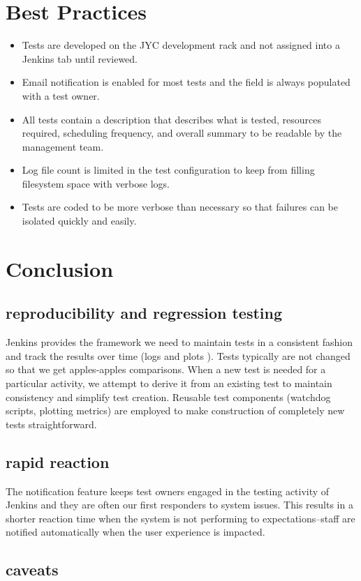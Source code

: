 \documentclass[10pt, conference, compsocconf]{IEEEtran}
\begin{document}
\section{Best Practices}
\begin{itemize}
\item Tests are developed on the JYC development rack and not assigned into a Jenkins tab until reviewed. 
\item Email notification is enabled for most tests and the field is always populated with a test owner.
\item All tests contain a description that describes what is tested, resources required, scheduling frequency, and overall summary  to be readable by the management team.
\item Log file count is limited in the test configuration to keep from filling filesystem space with verbose logs.
\item Tests are coded to be more verbose than necessary so that failures can be isolated quickly and easily.
\end{itemize}

\section{Conclusion}
\subsection{reproducibility and regression testing}
Jenkins provides the framework we need to maintain tests in a consistent fashion and track the results over time (logs and plots ).  Tests typically are not changed so that we get apples-apples comparisons.  When a new test is needed for a particular activity, we attempt to derive it from an existing test to maintain consistency and simplify test creation.  Reusable test components (watchdog scripts, plotting metrics) are employed to make construction of completely new tests straightforward.
\subsection{rapid reaction}
The notification feature keeps test owners engaged in the testing activity of Jenkins and they are often our first responders to system issues.  This results in a shorter reaction time when the system is not performing to expectations--staff are notified automatically when the user experience is impacted.
\subsection{caveats}
\end{document}
